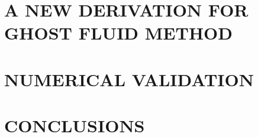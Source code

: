 \documentclass[dissertation]{uathesis}
\begin{document}
\begin{body}
\chapter{A NEW DERIVATION FOR GHOST FLUID METHOD}
\label{chap:new_GFM}


\chapter{NUMERICAL VALIDATION}
\label{chap:num_vald}
 

\chapter{CONCLUSIONS}
\label{chap: conclusions}


\renewcommand{\bibname}{REFERENCES}
\begin{singlespace}


%
%
\label{bib}
\end{singlespace}

\appendix










\end{body}
\end{document}
